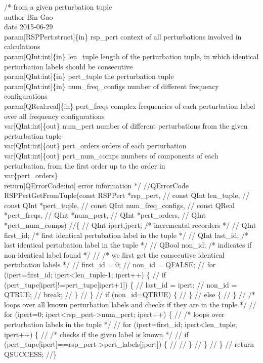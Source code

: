 /*%
        from a given perturbation tuple
    \\author Bin Gao
    \\date 2015-06-29
    \\param[RSPPert:struct]\{in\} rsp_pert context of all perturbations involved
        in calculations
    \\param[QInt:int]\{in\} len_tuple length of the perturbation tuple, in which
        identical perturbation labels should be consecutive
    \\param[QInt:int]\{in\} pert_tuple the perturbation tuple
    \\param[QInt:int]\{in\} num_freq_configs number of different frequency configurations
    \\param[QReal:real]\{in\} pert_freqs complex frequencies of each perturbation label
        over all frequency configurations
    \\var[QInt:int]\{out\} num_pert number of different perturbations from the given
        perturbation tuple
    \\var[QInt:int]\{out\} pert_orders orders of each perturbation
    \\var[QInt:int]\{out\} pert_num_comps numbers of components of each perturbation,
        from the first order up to the order in \\var\{pert_orders\}
    \\return[QErrorCode:int] error information
*/
//QErrorCode RSPPertGetFromTuple(const RSPPert *rsp_pert,
//                               const QInt len_tuple,
//                               const QInt *pert_tuple,
//                               const QInt num_freq_configs,
//                               const QReal *pert_freqs,
//                               QInt *num_pert,
//                               QInt *pert_orders,
//                               QInt *pert_num_comps)
//\{
//    QInt ipert,jpert;  /* incremental recorders */
//    QInt first_id;     /* first identical pertubation label in the tuple */
//    QInt last_id;      /* last identical pertubation label in the tuple */
//    QBool non_id;      /* indicates if non-identical label found */
//    /* we first get the consecutive identical pertubation labels */
//    first_id = 0;
//    non_id = QFALSE;
//    for (ipert=first_id; ipert<len_tuple-1; ipert++) \{
//        if (pert_tupe[ipert]!=pert_tupe[ipert+1]) \{
//            last_id = ipert;
//            non_id = QTRUE;
//            break;
//        \}
//    \}
//    if (non_id=QTRUE) \{
//    \}
//    else \{
//    \}
//    /* loops over all known perturbation labels and checks if they are in the tuple */
//    for (ipert=0; ipert<rsp_pert->num_pert; ipert++) \{
//        /* loops over perturbation labels in the tuple */
//        for (ipert=first_id; ipert<len_tuple; ipert++) \{
//            /* checks if the given label is known */
//            if (pert_tupe[ipert]==rsp_pert->pert_labels[jpert]) \{
//                
//            \}
//        \}
//    \}
//    return QSUCCESS;
//\}

